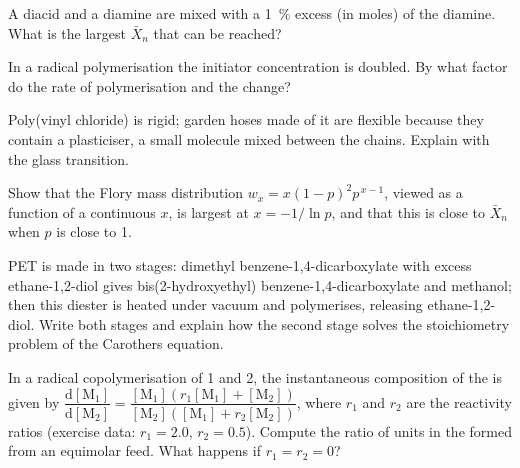 \begin{exercise}[$\star\star$]\label{exo:b2:polymer-synthesis:7}
A diacid and a diamine are mixed with a 1~\% excess (in moles) of the diamine. What is the largest
$\bar X_n$ that can be reached?
\end{exercise}

\begin{exercise}[$\star\star$]\label{exo:b2:polymer-synthesis:8}
In a radical polymerisation the initiator concentration is doubled. By what factor do the rate of
polymerisation and the  change?
\end{exercise}

\begin{exercise}[$\star\star$]\label{exo:b2:polymer-synthesis:9}
Poly(vinyl chloride) is rigid; garden hoses made of it are flexible because they contain a plasticiser,
a small molecule mixed between the chains. Explain with the glass transition.
\end{exercise}

\begin{exercise}[$\star\star\star$]\label{exo:b2:polymer-synthesis:10}
Show that the Flory mass distribution $w_x = x(1-p)^2p^{\,x-1}$, viewed as a function of a continuous
$x$, is largest at $x = -1/\ln p$, and that this is close to $\bar X_n$ when $p$ is close to 1.
\end{exercise}

\begin{exercise}[$\star\star\star$]\label{exo:b2:polymer-synthesis:11}
PET is made in two stages: dimethyl benzene-1,4-dicarboxylate with excess ethane-1,2-diol gives
bis(2-hydroxyethyl) benzene-1,4-dicarboxylate and methanol; then this diester is heated under vacuum
and polymerises, releasing ethane-1,2-diol. Write both stages and explain how the second stage
solves the stoichiometry problem of the Carothers equation.
\end{exercise}

\begin{exercise}[$\star\star\star$]\label{exo:b2:polymer-synthesis:12}
In a radical copolymerisation of  1 and 2, the instantaneous composition of the  is
given by $\dfrac{\mathrm d[\mathrm M_1]}{\mathrm d[\mathrm M_2]} = \dfrac{[\mathrm M_1](r_1[\mathrm M_1]
+ [\mathrm M_2])}{[\mathrm M_2]([\mathrm M_1] + r_2[\mathrm M_2])}$, where $r_1$ and $r_2$ are the
reactivity ratios (exercise data: $r_1 = 2.0$, $r_2 = 0.5$). Compute the ratio of units in the
 formed from an equimolar feed. What happens if $r_1 = r_2 = 0$?
\end{exercise}

